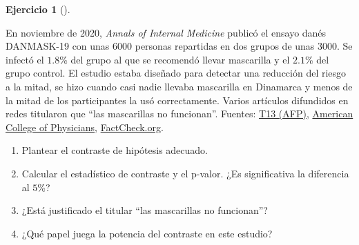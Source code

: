 \documentclass[
  spanish,
  a4paper,
]{scrreport}
\theoremstyle{definition}
\newtheorem{exercise}{Ejercicio}[chapter]
\theoremstyle{remark}
\begin{document}
\begin{exercise}[]\protect\hypertarget{exr-interpretacion-mascarillas}{}\label{exr-interpretacion-mascarillas}

En noviembre de 2020, \emph{Annals of Internal Medicine} publicó el
ensayo danés DANMASK-19 con unas \(6000\) personas repartidas en dos
grupos de unas \(3000\). Se infectó el \(1.8\)\% del grupo al que se
recomendó llevar mascarilla y el \(2.1\)\% del grupo control. El estudio
estaba diseñado para detectar una reducción del riesgo a la mitad, se
hizo cuando casi nadie llevaba mascarilla en Dinamarca y menos de la
mitad de los participantes la usó correctamente. Varios artículos
difundidos en redes titularon que ``las mascarillas no funcionan''.
Fuentes:
\href{https://www.t13.cl/noticia/mundo/estudio-uso-mascarilla-tiene-poco-efecto-protegerse-del-coronavirus}{T13
(AFP)},
\href{https://www.acponline.org/acp-newsroom/denmark-trial-measures-effectiveness-of-adding-a-mask-recommendation-to-other-public-health-measures}{American
College of Physicians},
\href{https://www.factcheck.org/2020/11/danish-study-doesnt-prove-masks-dont-work-against-the-coronavirus}{FactCheck.org}.

\begin{enumerate}
\def\labelenumi{\alph{enumi}.}
\item
  Plantear el contraste de hipótesis adecuado.
\item
  Calcular el estadístico de contraste y el p-valor. ¿Es significativa
  la diferencia al \(5\)\%?
\item
  ¿Está justificado el titular ``las mascarillas no funcionan''?
\item
  ¿Qué papel juega la potencia del contraste en este estudio?
\end{enumerate}

\end{exercise}
\end{document}
